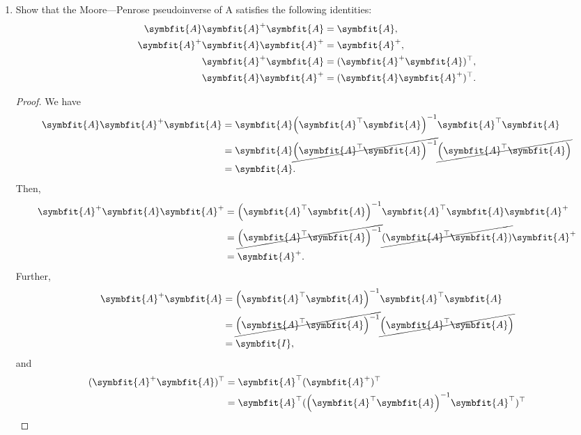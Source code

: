 \documentclass{article}
\theoremstyle{definition}
\newcommand{\mat}[1]{\symbfit{#1}}
\begin{document}
\begin{enumerate}[leftmargin=\labelsep]
	\item Show that the Moore—Penrose pseudoinverse of A satisfies the following identities:
	      \begin{align*}
		      \mat{A}\mat{A}^+\mat{A}   & = \mat{A},                 \\
		      \mat{A}^+\mat{A}\mat{A}^+ & = \mat{A}^+,               \\
		      \mat{A}^+\mat{A}          & = (\mat{A}^+\mat{A})^\top, \\
		      \mat{A}\mat{A}^+          & = (\mat{A}\mat{A}^+)^\top.
	      \end{align*}
	      \begin{proof}
		      We have
		      \begin{align*}
			      \mat{A}\mat{A}^+\mat{A} & = \mat{A}\qty(\mat{A}^{\top}\mat{A})^{-1}\mat{A}^{\top}\mat{A}                          \\
			                              & = \mat{A}\cancel{\qty(\mat{A}^{\top}\mat{A})^{-1}}\cancel{\qty(\mat{A}^{\top}\mat{A}) } \\
			                              & = \mat{A}.
		      \end{align*}
		      Then,
		      \begin{align*}
			      \mat{A}^+\mat{A}\mat{A}^+ & = \qty(\mat{A}^{\top}\mat{A})^{-1}\mat{A}^{\top}\mat{A}\mat{A}^+                     \\
			                                & = \cancel{\qty(\mat{A}^{\top}\mat{A})^{-1}}\cancel{(\mat{A}^{\top}\mat{A})}\mat{A}^+ \\
			                                & = \mat{A}^+.
		      \end{align*}
		      Further,
		      \begin{align*}
			      \mat{A}^+\mat{A} & = \qty(\mat{A}^{\top}\mat{A})^{-1}\mat{A}^{\top}\mat{A}                          \\
			                       & = \cancel{\qty(\mat{A}^{\top}\mat{A})^{-1}}\cancel{\qty(\mat{A}^{\top}\mat{A}) } \\
			                       & = \mat{I},
		      \end{align*}
		      and
		      \begin{align*}
			      (\mat{A}^+\mat{A})^\top & = \mat{A}^{\top} (\mat{A}^+)^{\top}                                                \\
			                              & = \mat{A}^{\top} (\qty(\mat{A}^{\top}\mat{A})^{-1}\mat{A}^{\top})^{\top}           \\

\end{align*}
\end{proof}
\end{enumerate}
\end{document}
